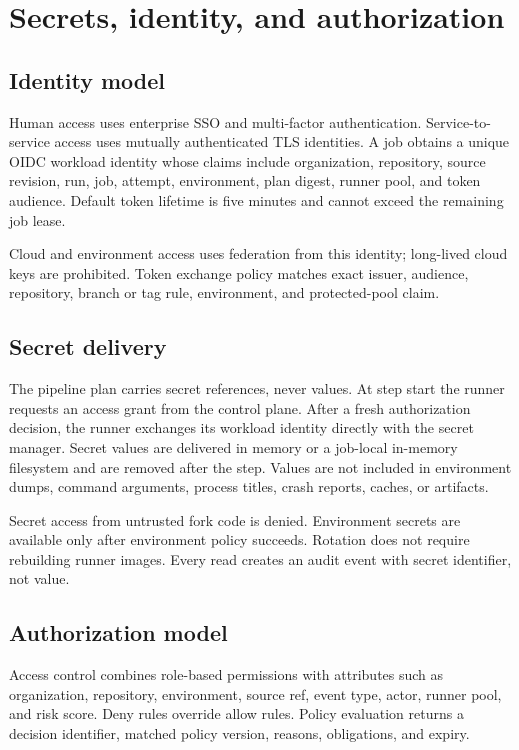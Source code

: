 \section{Secrets, identity, and authorization}

\subsection{Identity model}

Human access uses enterprise SSO and multi-factor authentication. Service-to-service
access uses mutually authenticated TLS identities. A job obtains a unique OIDC workload
identity whose claims include organization, repository, source revision, run, job,
attempt, environment, plan digest, runner pool, and token audience. Default token
lifetime is five minutes and cannot exceed the remaining job lease.

Cloud and environment access uses federation from this identity; long-lived cloud
keys are prohibited. Token exchange policy matches exact issuer, audience, repository,
branch or tag rule, environment, and protected-pool claim.

\subsection{Secret delivery}

The pipeline plan carries secret references, never values. At step start the runner
requests an access grant from the control plane. After a fresh authorization decision,
the runner exchanges its workload identity directly with the secret manager. Secret
values are delivered in memory or a job-local in-memory filesystem and are removed
after the step. Values are not included in environment dumps, command arguments,
process titles, crash reports, caches, or artifacts.

Secret access from untrusted fork code is denied. Environment secrets are available
only after environment policy succeeds. Rotation does not require rebuilding runner
images. Every read creates an audit event with secret identifier, not value.

\subsection{Authorization model}

Access control combines role-based permissions with attributes such as organization,
repository, environment, source ref, event type, actor, runner pool, and risk score.
Deny rules override allow rules. Policy evaluation returns a decision identifier,
matched policy version, reasons, obligations, and expiry.

